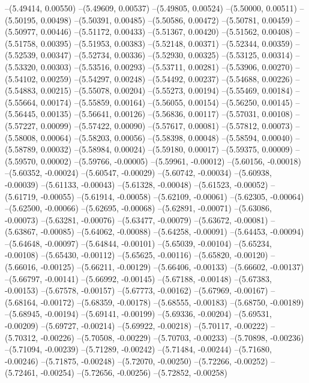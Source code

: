 --(5.49414, 0.00550)
--(5.49609, 0.00537)
--(5.49805, 0.00524)
--(5.50000, 0.00511)
--(5.50195, 0.00498)
--(5.50391, 0.00485)
--(5.50586, 0.00472)
--(5.50781, 0.00459)
--(5.50977, 0.00446)
--(5.51172, 0.00433)
--(5.51367, 0.00420)
--(5.51562, 0.00408)
--(5.51758, 0.00395)
--(5.51953, 0.00383)
--(5.52148, 0.00371)
--(5.52344, 0.00359)
--(5.52539, 0.00347)
--(5.52734, 0.00336)
--(5.52930, 0.00325)
--(5.53125, 0.00314)
--(5.53320, 0.00303)
--(5.53516, 0.00293)
--(5.53711, 0.00281)
--(5.53906, 0.00270)
--(5.54102, 0.00259)
--(5.54297, 0.00248)
--(5.54492, 0.00237)
--(5.54688, 0.00226)
--(5.54883, 0.00215)
--(5.55078, 0.00204)
--(5.55273, 0.00194)
--(5.55469, 0.00184)
--(5.55664, 0.00174)
--(5.55859, 0.00164)
--(5.56055, 0.00154)
--(5.56250, 0.00145)
--(5.56445, 0.00135)
--(5.56641, 0.00126)
--(5.56836, 0.00117)
--(5.57031, 0.00108)
--(5.57227, 0.00099)
--(5.57422, 0.00090)
--(5.57617, 0.00081)
--(5.57812, 0.00073)
--(5.58008, 0.00064)
--(5.58203, 0.00056)
--(5.58398, 0.00048)
--(5.58594, 0.00040)
--(5.58789, 0.00032)
--(5.58984, 0.00024)
--(5.59180, 0.00017)
--(5.59375, 0.00009)
--(5.59570, 0.00002)
--(5.59766, -0.00005)
--(5.59961, -0.00012)
--(5.60156, -0.00018)
--(5.60352, -0.00024)
--(5.60547, -0.00029)
--(5.60742, -0.00034)
--(5.60938, -0.00039)
--(5.61133, -0.00043)
--(5.61328, -0.00048)
--(5.61523, -0.00052)
--(5.61719, -0.00055)
--(5.61914, -0.00058)
--(5.62109, -0.00061)
--(5.62305, -0.00064)
--(5.62500, -0.00066)
--(5.62695, -0.00068)
--(5.62891, -0.00071)
--(5.63086, -0.00073)
--(5.63281, -0.00076)
--(5.63477, -0.00079)
--(5.63672, -0.00081)
--(5.63867, -0.00085)
--(5.64062, -0.00088)
--(5.64258, -0.00091)
--(5.64453, -0.00094)
--(5.64648, -0.00097)
--(5.64844, -0.00101)
--(5.65039, -0.00104)
--(5.65234, -0.00108)
--(5.65430, -0.00112)
--(5.65625, -0.00116)
--(5.65820, -0.00120)
--(5.66016, -0.00125)
--(5.66211, -0.00129)
--(5.66406, -0.00133)
--(5.66602, -0.00137)
--(5.66797, -0.00141)
--(5.66992, -0.00145)
--(5.67188, -0.00148)
--(5.67383, -0.00153)
--(5.67578, -0.00157)
--(5.67773, -0.00162)
--(5.67969, -0.00167)
--(5.68164, -0.00172)
--(5.68359, -0.00178)
--(5.68555, -0.00183)
--(5.68750, -0.00189)
--(5.68945, -0.00194)
--(5.69141, -0.00199)
--(5.69336, -0.00204)
--(5.69531, -0.00209)
--(5.69727, -0.00214)
--(5.69922, -0.00218)
--(5.70117, -0.00222)
--(5.70312, -0.00226)
--(5.70508, -0.00229)
--(5.70703, -0.00233)
--(5.70898, -0.00236)
--(5.71094, -0.00239)
--(5.71289, -0.00242)
--(5.71484, -0.00244)
--(5.71680, -0.00246)
--(5.71875, -0.00248)
--(5.72070, -0.00250)
--(5.72266, -0.00252)
--(5.72461, -0.00254)
--(5.72656, -0.00256)
--(5.72852, -0.00258)
